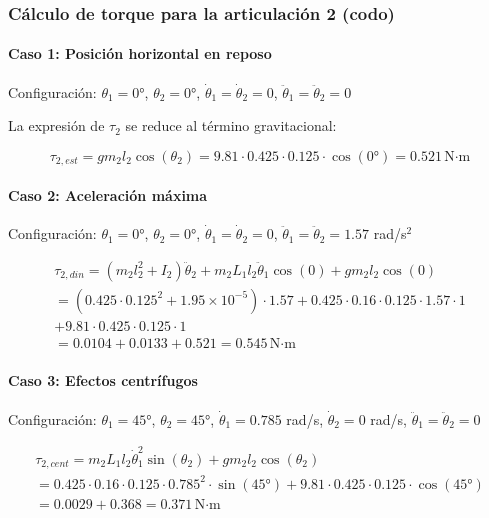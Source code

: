 
\subsubsection{Cálculo de torque para la articulación 2 (codo)}

\paragraph{Caso 1: Posición horizontal en reposo}

Configuración: $\theta_1 = 0°$, $\theta_2 = 0°$, $\dot{\theta}_1 = \dot{\theta}_2 = 0$, $\ddot{\theta}_1 = \ddot{\theta}_2 = 0$

La expresión de $\tau_2$ se reduce al término gravitacional:

\begin{equation}
\tau_{2,est} = gm_2l_2\cos(\theta_2) = 9.81 \cdot 0.425 \cdot 0.125 \cdot \cos(0°) = 0.521 \, \text{N·m}
\end{equation}

\paragraph{Caso 2: Aceleración máxima}

Configuración: $\theta_1 = 0°$, $\theta_2 = 0°$, $\dot{\theta}_1 = \dot{\theta}_2 = 0$, $\ddot{\theta}_1 = \ddot{\theta}_2 = 1.57$ rad/s$^2$

\begin{multline}
\tau_{2,din} = (m_2l_2^2 + I_2)\ddot{\theta}_2 + m_2L_1l_2\ddot{\theta}_1\cos(0) + gm_2l_2\cos(0) \\
= (0.425 \cdot 0.125^2 + 1.95 \times 10^{-5}) \cdot 1.57 + 0.425 \cdot 0.16 \cdot 0.125 \cdot 1.57 \cdot 1 \\
+ 9.81 \cdot 0.425 \cdot 0.125 \cdot 1 \\
= 0.0104 + 0.0133 + 0.521 = 0.545 \, \text{N·m}
\end{multline}

\paragraph{Caso 3: Efectos centrífugos}

Configuración: $\theta_1 = 45°$, $\theta_2 = 45°$, $\dot{\theta}_1 = 0.785$ rad/s, $\dot{\theta}_2 = 0$ rad/s, $\ddot{\theta}_1 = \ddot{\theta}_2 = 0$

\begin{multline}
\tau_{2,cent} = m_2L_1l_2\dot{\theta}_1^2\sin(\theta_2) + gm_2l_2\cos(\theta_2) \\
= 0.425 \cdot 0.16 \cdot 0.125 \cdot 0.785^2 \cdot \sin(45°) + 9.81 \cdot 0.425 \cdot 0.125 \cdot \cos(45°) \\
= 0.0029 + 0.368 = 0.371 \, \text{N·m}
\end{multline}

